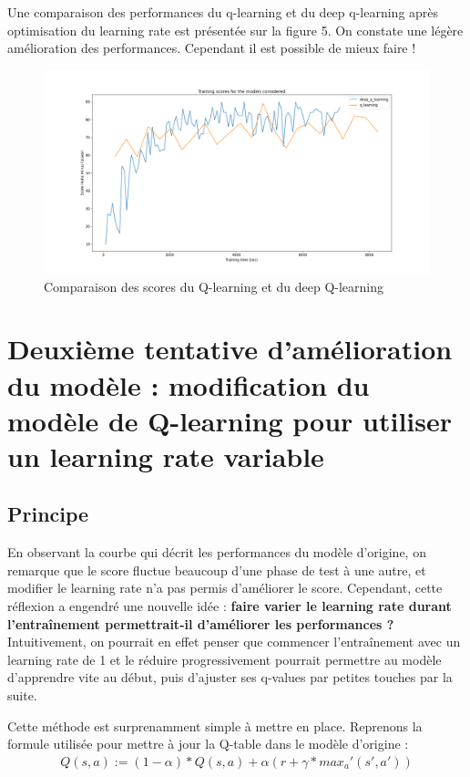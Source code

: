 \documentclass[french]{article}
\begin{document}
    Une comparaison des performances du q-learning et du deep q-learning après optimisation du learning rate est présentée sur la figure 5. On constate une légère amélioration des performances. Cependant il est possible de mieux faire !
    
    \begin{figure}[h]
        \includegraphics[width=12cm]{deep_q_learning_metrics}
        \centering
        \caption{Comparaison des scores du Q-learning et du deep Q-learning}
        \centering
    \end{figure}

    \section{Deuxième tentative d'amélioration du modèle : modification du modèle de Q-learning pour utiliser un learning rate variable}

    \subsection{Principe}

    En observant la courbe qui décrit les performances du modèle d'origine, on remarque que le score fluctue beaucoup d'une phase de test à une autre, et modifier le learning rate n'a pas permis d'améliorer le score. Cependant, cette réflexion a engendré une nouvelle idée : \textbf{faire varier le learning rate durant l'entraînement permettrait-il d'améliorer les performances ?} Intuitivement, on pourrait en effet penser que commencer l'entraînement avec un learning rate de 1 et le réduire progressivement pourrait permettre au modèle d'apprendre vite au début, puis d'ajuster ses q-values par petites touches par la suite.

    Cette méthode est surprenamment simple à mettre en place. Reprenons la formule utilisée pour mettre à jour la Q-table dans le modèle d'origine :
    \begin{align*}
        Q(s,a) := (1-\alpha)*Q(s,a) + \alpha(r + \gamma * max_a'(s',a'))
    \end{align*}
\end{document}
